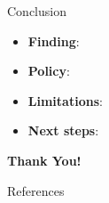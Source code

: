 \begin{frame}{Conclusion}
\begin{itemize}
    \item \textbf{Finding}: 
    \item \textbf{Policy}: 
    \item \textbf{Limitations}: 
    \item \textbf{Next steps}: 
\end{itemize}
\end{frame}

\begin{frame}{}
\centering
\vspace{2cm}
{\LARGE \textbf{Thank You!}}\\[1em]
\end{frame}

\begin{frame}[allowframebreaks]{References}
\printbibliography[heading=none]
\end{frame}
